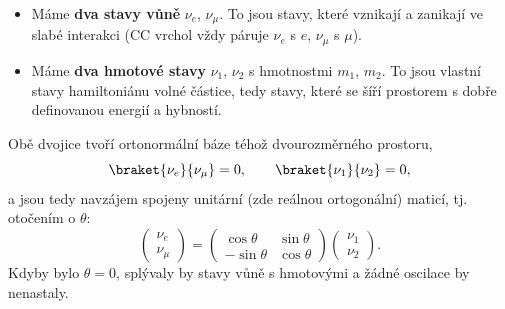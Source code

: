 \begin{itemize}[nosep]
  \item Máme \textbf{dva stavy vůně} \(\nu_e\), \(\nu_\mu\). To jsou stavy, které vznikají a zanikají ve slabé interakci (CC vrchol vždy páruje \(\nu_e\) s \(e\), \(\nu_\mu\) s \(\mu\)).
  \item Máme \textbf{dva hmotové stavy} \(\nu_1\), \(\nu_2\) s hmotnostmi \(m_1\), \(m_2\). To jsou vlastní stavy hamiltoniánu volné částice, tedy stavy, které se šíří prostorem s dobře definovanou energií a hybností.
\end{itemize}
Obě dvojice tvoří ortonormální báze téhož dvourozměrného prostoru,
\[
  \braket{\nu_e}{\nu_\mu}=0,\qquad \braket{\nu_1}{\nu_2}=0,
\]
a jsou tedy navzájem spojeny unitární (zde reálnou ortogonální) maticí, tj. otočením o  \(\theta\):
\begin{equation}
  \begin{pmatrix}\nu_e\\ \nu_\mu\end{pmatrix}
  =\begin{pmatrix}\cos\theta & \sin\theta\\ -\sin\theta & \cos\theta\end{pmatrix}
  \begin{pmatrix}\nu_1\\ \nu_2\end{pmatrix}.
\end{equation}
Kdyby bylo \(\theta=0\), splývaly by stavy vůně s hmotovými a žádné oscilace by nenastaly.

